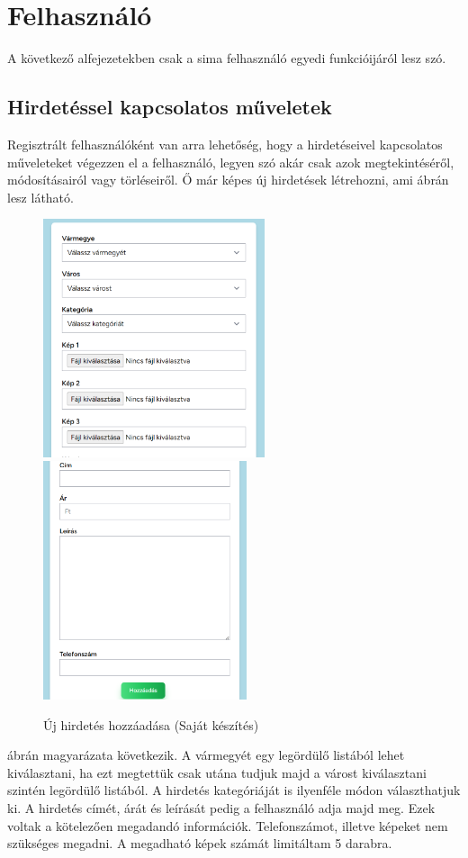 \documentclass[]{thesis-ekf}
\theoremstyle{definition}
\theoremstyle{remark}
\begin{document}
	\section{Felhasználó}
		A következő alfejezetekben csak a sima felhasználó egyedi funkcióijáról lesz szó.
	\subsection{Hirdetéssel kapcsolatos műveletek}
		Regisztrált felhasználóként van arra lehetőség, hogy a hirdetéseivel kapcsolatos műveleteket végezzen el a felhasználó, legyen szó akár csak azok megtekintéséről, módosításairól vagy törléseiről. Ő már képes új hirdetések létrehozni, ami  ábrán lesz látható.
		\begin{figure}[ht!]
			\centering
			\includegraphics[height=7cm]{./felhasznaloi/hozzadas1}
			\includegraphics[height=7cm]{./felhasznaloi/hozzadas2}
			\caption{Új hirdetés hozzáadása (Saját készítés)} 
			\label{hirdetes-hozzadas-muvelet}
		\end{figure}
		 ábrán magyarázata következik. A vármegyét egy legördülő listából lehet kiválasztani, ha ezt megtettük csak utána tudjuk majd a várost kiválasztani szintén legördülő listából. A hirdetés kategóriáját is ilyenféle módon választhatjuk ki. A hirdetés címét, árát és leírását pedig a felhasználó adja majd meg. Ezek voltak a kötelezően megadandó információk. Telefonszámot, illetve képeket nem szükséges megadni. A megadható képek számát limitáltam 5 darabra.
\end{document}
